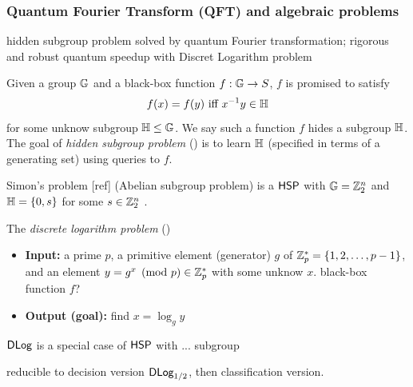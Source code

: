 \subsubsection{Quantum Fourier Transform (QFT) and algebraic problems}
hidden subgroup problem solved by quantum Fourier transformation\cite{childsQuantumAlgorithmsAlgebraic2010};
rigorous and robust quantum speedup with Discret Logarithm problem \cite{liuRigorousRobustQuantum2021}
\begin{problem}\label{prm:hidden_subgroup}
	Given a group $\mathbb{G}$ and a black-box function $f:\mathbb{G}\to S$, 
	$f$ is promised to satisfy 
	\begin{equation}
		f(x) =f(y) \text{ iff } x^{-1}y \in \mathbb{H} 
	\end{equation}
	for some unknow subgroup $\mathbb{H} \le \mathbb{G}$.
	We say such a function $f$ hides a subgroup $\mathbb{H}$.
	The goal of \emph{hidden subgroup problem} (\hsp) is to learn $\mathbb{H}$
	(specified in terms of a generating set) using queries to $f$.
\end{problem}
\begin{remark}
	Simon's problem [ref] (Abelian subgroup problem) is a $\textsf{HSP}$ with $\mathbb{G} = \mathbb{Z}^n_2$ and $\mathbb{H} = \qty{ 0, s }$ for some $s \in \mathbb{Z}_2^n$ .
\end{remark}
\begin{problem}\label{prm:dlog}
	The \emph{discrete logarithm problem} (\dlog) 
	\begin{itemize}
		\item \textbf{Input:} a prime $p$, a primitive element (generator) $g$ of $\mathbb{Z}_p^*=\qty{1,2,\dots,p-1}$, and an element $y=g^x \pmod{p} \in\mathbb{Z}_p^*$ with some unknow $x$. black-box function $f$?
		\item \textbf{Output (goal):} find $x=\log_g y$
	\end{itemize}
	$\textsf{DLog}$ is a special case of $\textsf{HSP}$ with ... subgroup 
\end{problem}
reducible to decision version $\textsf{DLog}_{1/2}$, then classification version.

